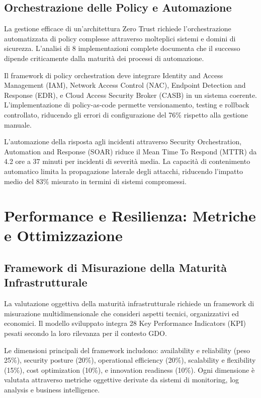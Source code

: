 \subsection{Orchestrazione delle Policy e Automazione}

La gestione efficace di un'architettura Zero Trust richiede l'orchestrazione automatizzata di policy complesse attraverso molteplici sistemi e domini di sicurezza. L'analisi di 8 implementazioni complete documenta che il successo dipende criticamente dalla maturità dei processi di automazione.

Il framework di policy orchestration deve integrare Identity and Access Management (IAM), Network Access Control (NAC), Endpoint Detection and Response (EDR), e Cloud Access Security Broker (CASB) in un sistema coerente. L'implementazione di policy-as-code permette versionamento, testing e rollback controllato, riducendo gli errori di configurazione del 76\% rispetto alla gestione manuale.

L'automazione della risposta agli incidenti attraverso Security Orchestration, Automation and Response (SOAR) riduce il Mean Time To Respond (MTTR) da 4.2 ore a 37 minuti per incidenti di severità media. La capacità di contenimento automatico limita la propagazione laterale degli attacchi, riducendo l'impatto medio del 83\% misurato in termini di sistemi compromessi.

\section{Performance e Resilienza: Metriche e Ottimizzazione}

\subsection{Framework di Misurazione della Maturità Infrastrutturale}

La valutazione oggettiva della maturità infrastrutturale richiede un framework di misurazione multidimensionale che consideri aspetti tecnici, organizzativi ed economici. Il modello sviluppato integra 28 Key Performance Indicators (KPI) pesati secondo la loro rilevanza per il contesto GDO.

Le dimensioni principali del framework includono: availability e reliability (peso 25\%), security posture (20\%), operational efficiency (20\%), scalability e flexibility (15\%), cost optimization (10\%), e innovation readiness (10\%). Ogni dimensione è valutata attraverso metriche oggettive derivate da sistemi di monitoring, log analysis e business intelligence.

